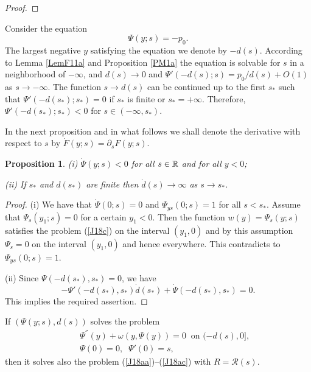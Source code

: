 \documentclass[a4paper,reqno,12pt]{amsart}
\theoremstyle{plain}
\newtheorem{proposition}[theorem]{Proposition}
\theoremstyle{definition}
\numberwithin{equation}{section}
\begin{document}
\begin{proof}
\end{proof}

Consider the equation
\begin{equation}\label{M1a}
\Psi(y;s)=-p_0.
\end{equation}
The largest negative $y$ satisfying the equation we denote by $-d(s)$. According to Lemma \ref{LemF11a} and Proposition \ref{PM1a} the equation is solvable for $s$ in a neighborhood of $-\infty$, and  $d(s)\to 0$ and $\Psi'(-d(s);s)=p_0/d(s)+O(1)$ as $s\to-\infty$. The function $s\to d(s)$ can be continued up to the first $s_*$ such that $\Psi'(-d(s_*);s_*)=0$ if $s_*$ is finite or $s_*=+\infty$. Therefore, $\Psi'(-d(s_*);s_*)<0$ for $s\in (-\infty, s_*)$.


In the next proposition and in what follows we shall denote the derivative with respect to $s$ by $\dot{F}(y;s)=\partial_s F(y;s)$.

\begin{proposition}\label{PF20a} (i) $\dot{\Psi}(y;s)<0$ for all $s\in\Bbb R$ and for all $y<0$;

(ii) If $s_*$ and $d(s_*)$ are finite then
 $\dot{d}(s)\to\infty$ as $s\to s_*$.

\end{proposition}
\begin{proof} (i) We have that $\dot{\Psi}(0;s)=0$ and $\Psi_{ys}(0;s)=1$ for all $s<s_*$. Assume that
$\Psi_s(y_1;s)=0$ for a certain $y_1<0$. Then the function $w(y)=\Psi_s(y;s)$ satisfies the problem (\ref{J18c}) on the interval $(y_1,0)$ and by this assumption $\Psi_s=0$ on the interval $(y_1,0)$ and hence everywhere. This contradicts to
$\Psi_{ys}(0;s)=1$.

(ii) Since $\Psi(-d(s_*),s_*)=0$, we have
$$
-\Psi'(-d(s_*),s_*)\dot{d}(s_*)+\dot{\Psi}(-d(s_*),s_*)=0.
$$
This implies the required assertion.
\end{proof}





If $(\Psi(y;s),d(s))$ solves the problem
\begin{eqnarray}\label{F19az}
&&\Psi^{''}(y)+\omega(y,\Psi(y))=0\;\;\mbox{on $(-d(s),0]$},\nonumber\\
&&\Psi(0)=0,\;\;\Psi'(0)=s,
\end{eqnarray}
then it solves also the problem (\ref{J18aa})--(\ref{J18ac}) with
$
R={\mathcal R}(s).
$
\end{document}
